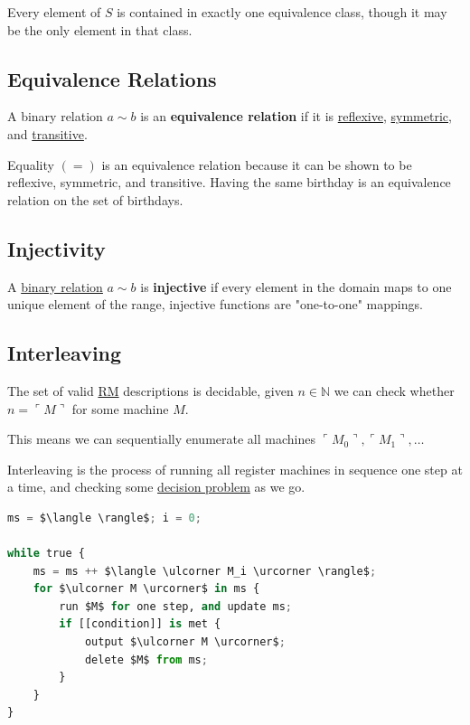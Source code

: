 \documentclass{article}
\begin{document}
Every element of $S$ is contained in exactly one equivalence class, though it may be the only element in that class.


\subsection{Equivalence Relations}\label{equivalence-relation}
A binary relation $a \sim b$ is an \textbf{equivalence relation} if it is \hyperref[reflexive]{reflexive}, \hyperref[symmetric]{symmetric}, and \hyperref[transitive]{transitive}.

Equality $(=)$ is an equivalence relation because it can be shown to be reflexive, symmetric, and transitive. Having the same birthday is an equivalence relation on the set of birthdays.


\subsection{Injectivity}\label{injective}
A \hyperref[binary-relation]{binary relation} $a \sim b$ is \textbf{injective} if every element in the domain maps to one unique element of the range, injective functions are "one-to-one" mappings.


\subsection{Interleaving}\label{interleaving}
The set of valid \hyperref[rm]{RM} descriptions is decidable, given $n \in \mathbb{N}$ we can check whether $n = \ulcorner M \urcorner$ for some machine $M$.

This means we can sequentially enumerate all machines $\ulcorner M_0 \urcorner, \ulcorner M_1 \urcorner, \dots$

Interleaving is the process of running all register machines in sequence one step at a time, and checking some \hyperref[decision-problem]{decision problem} as we go.\\

\begin{lstlisting}[language=Python]
ms = $\langle \rangle$; i = 0;

while true {
    ms = ms ++ $\langle \ulcorner M_i \urcorner \rangle$;
    for $\ulcorner M \urcorner$ in ms {
        run $M$ for one step, and update ms;
        if [[condition]] is met {
            output $\ulcorner M \urcorner$;
            delete $M$ from ms;
        }
    }
}

\end{lstlisting}
\end{document}

